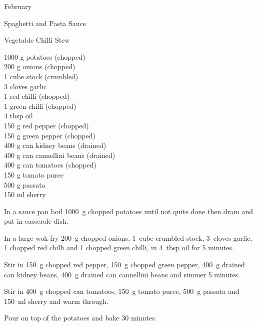 \begin{menu}{February}
\begin{recipe}{2}{Spaghetti and Pasta Sauce}
\begin{instructions}
    \end{instructions}
    \end{recipe}%
  
    \begin{recipe}{2}{Vegetable Chilli Stew}%
		\begin{ingredients}
		1000 g potatoes (chopped) \\
	200 g onions (chopped) \\
	1 cube stock (crumbled) \\
	3 cloves garlic  \\
	1  red chilli (chopped) \\
	1  green chilli (chopped) \\
	4 tbsp oil  \\
	150 g red pepper (chopped) \\
	150 g green pepper (chopped) \\
	400 g can kidney beans (drained) \\
	400 g can cannellini beans (drained) \\
	400 g can tomatoes (chopped) \\
	150 g tomato puree  \\
	500 g passata  \\
	150 ml sherry  \\
	
		\end{ingredients}
	
	
    \begin{instructions}
    \item 
        In a sauce pan boil
        1000~g chopped potatoes
        until not quite done
        then drain and put in casserole dish.
      \item 
        In a large wok fry
        200~g chopped onions,
        1~cube crumbled stock,
        3~cloves  garlic,
        1 chopped red chilli
        and
        1 chopped green chilli,
        in
        4~tbsp  oil
        for 5 minutes.
      \item 
        Stir in
        150~g chopped red pepper,
        150~g chopped green pepper,
        400~g drained can kidney beans,
        400~g drained can cannellini beans
        and simmer 5 minutes.
      \item 
        Stir in
        400~g chopped can tomatoes,
        150~g  tomato puree,
        500~g  passata
        and
        150~ml  sherry
        and warm through.
      \item 
        Pour on top of the potatoes
        and bake 30 minutes.
      

\end{instructions}
\end{recipe}
\end{menu}
